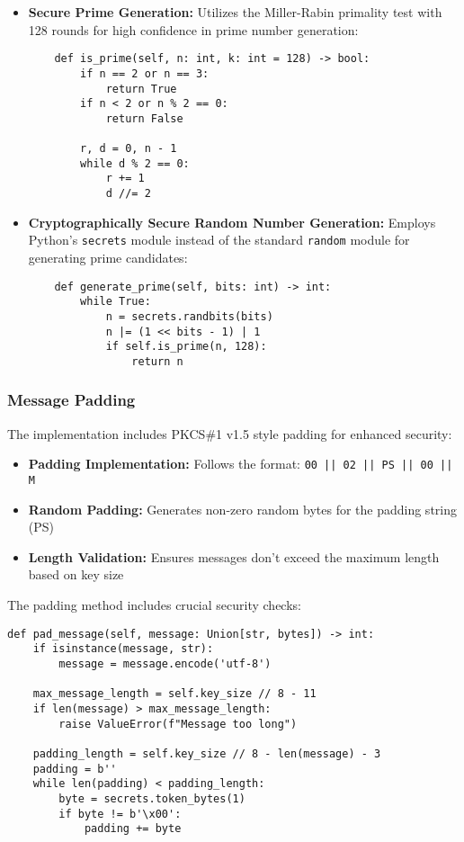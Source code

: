 \documentclass[12pt]{article}
\begin{document}
\begin{itemize}
    \item \textbf{Secure Prime Generation:} Utilizes the Miller-Rabin primality test with 128 rounds for high confidence in prime number generation:
    \begin{verbatim}
    def is_prime(self, n: int, k: int = 128) -> bool:
        if n == 2 or n == 3:
            return True
        if n < 2 or n % 2 == 0:
            return False
        
        r, d = 0, n - 1
        while d % 2 == 0:
            r += 1
            d //= 2
    \end{verbatim}

    \item \textbf{Cryptographically Secure Random Number Generation:} Employs Python's \texttt{secrets} module instead of the standard \texttt{random} module for generating prime candidates:
    \begin{verbatim}
    def generate_prime(self, bits: int) -> int:
        while True:
            n = secrets.randbits(bits)
            n |= (1 << bits - 1) | 1
            if self.is_prime(n, 128):
                return n
    \end{verbatim}
\end{itemize}

\subsubsection{Message Padding}
The implementation includes PKCS\#1 v1.5 style padding for enhanced security:

\begin{itemize}
    \item \textbf{Padding Implementation:} Follows the format: \texttt{00 || 02 || PS || 00 || M}
    \item \textbf{Random Padding:} Generates non-zero random bytes for the padding string (PS)
    \item \textbf{Length Validation:} Ensures messages don't exceed the maximum length based on key size
\end{itemize}

The padding method includes crucial security checks:
\begin{verbatim}
def pad_message(self, message: Union[str, bytes]) -> int:
    if isinstance(message, str):
        message = message.encode('utf-8')
    
    max_message_length = self.key_size // 8 - 11
    if len(message) > max_message_length:
        raise ValueError(f"Message too long")
        
    padding_length = self.key_size // 8 - len(message) - 3
    padding = b''
    while len(padding) < padding_length:
        byte = secrets.token_bytes(1)
        if byte != b'\x00':
            padding += byte
\end{verbatim}
\end{document}
